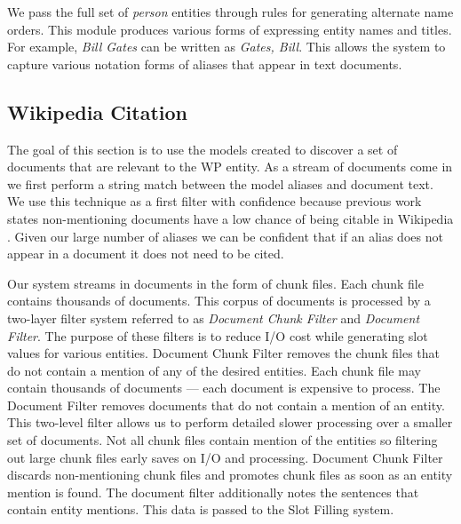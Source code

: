\documentclass[letterpaper]{article}
\begin{document}
We pass the full set of \textit{person} entities through rules for generating alternate name orders.
This module produces various forms of expressing entity names and titles.
For example, \textsl{Bill Gates} can be written as \textsl{Gates, Bill}.
This allows the system to capture various notation forms of aliases that appear in text documents.

\subsection{Wikipedia Citation}
The goal of this section is to use the models created to discover a set of documents that are relevant to the WP entity.
As a stream of documents come in we first perform a string match between the model aliases and document text. 
We use this technique as a first filter with confidence because previous work states non-mentioning
documents have a low chance of being citable in Wikipedia \cite{frank2013building}.
Given our large number of aliases we can be confident that if an alias does not appear in a document it does not need to be cited.

Our system streams in documents in the form of chunk files.
Each chunk file contains thousands of documents.
This corpus of documents is processed by a two-layer filter system referred to as \textit{Document Chunk Filter} and \textit{Document Filter}.
The purpose of these filters is to reduce I/O cost while generating slot values for various entities.
Document Chunk Filter removes the chunk files that do not contain a mention of any of the desired entities.
Each chunk file may contain thousands of documents --- each document is expensive to process.
The Document Filter removes documents that do not contain a mention of an entity.
This two-level filter allows us to perform detailed slower processing over a smaller set of documents.
Not all chunk files contain mention of the entities so filtering out large chunk files early saves on I/O and processing.
Document Chunk Filter discards non-mentioning chunk files and promotes chunk files as soon as an entity mention is found.
The document filter additionally notes the sentences that contain entity mentions.
This data is passed to the Slot Filling system.
\end{document}

